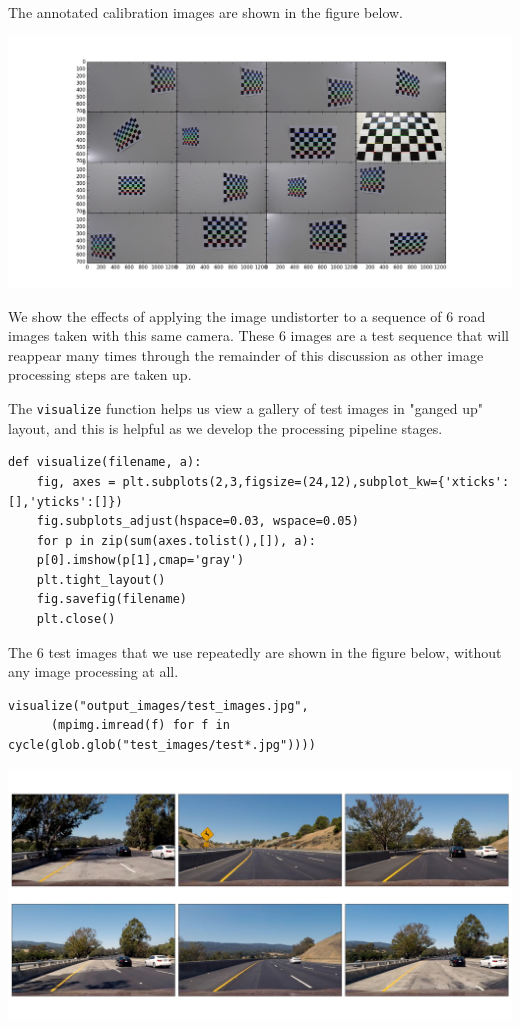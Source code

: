 \documentclass[11pt]{article}
\begin{document}
The annotated calibration images are shown in the figure below.

\includegraphics[width=.9\linewidth]{output_images/annotated_calibration_images.jpg}

We show the effects of applying the image undistorter to a
sequence of 6 road images taken with this same camera.  These 6
images are a test sequence that will reappear many times through
the remainder of this discussion as other image processing steps
are taken up.  

The \texttt{visualize} function helps us view a gallery of test images
in "ganged up" layout, and this is helpful as we develop the
processing pipeline stages.

\begin{verbatim}
def visualize(filename, a):
    fig, axes = plt.subplots(2,3,figsize=(24,12),subplot_kw={'xticks':[],'yticks':[]})
    fig.subplots_adjust(hspace=0.03, wspace=0.05)
    for p in zip(sum(axes.tolist(),[]), a):
	p[0].imshow(p[1],cmap='gray')
    plt.tight_layout()
    fig.savefig(filename)
    plt.close()
\end{verbatim}

The 6 test images that we use repeatedly are shown in the figure
below, without any image processing at all.

\begin{verbatim}
visualize("output_images/test_images.jpg",
	  (mpimg.imread(f) for f in cycle(glob.glob("test_images/test*.jpg"))))
\end{verbatim}

\includegraphics[width=.9\linewidth]{output_images/test_images.jpg}
\end{document}
